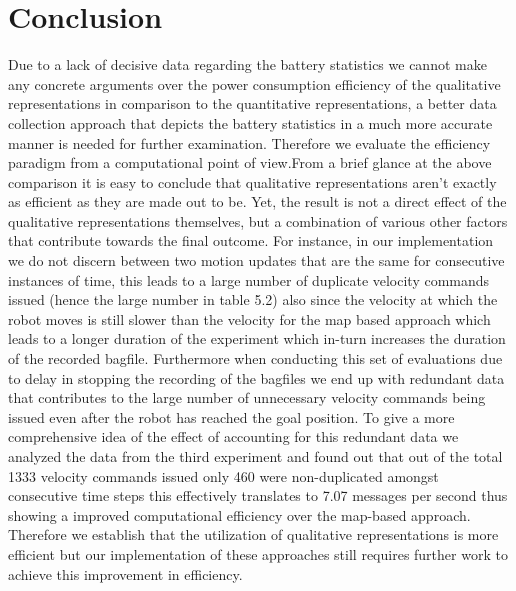 \section{Conclusion}
Due to a lack of decisive data regarding the battery statistics we cannot make any concrete arguments over the power consumption efficiency of the qualitative representations in comparison to the quantitative representations, a better data collection approach that depicts the battery statistics in a much more accurate manner is needed for further examination. Therefore we evaluate the efficiency paradigm from a computational point of view.From a brief glance at the above comparison it is easy to conclude that qualitative representations aren't exactly as efficient as they are made out to be. Yet, the result is not a direct effect of the qualitative representations themselves, but a combination of various other factors that contribute towards the final outcome. For instance, in our implementation we do not discern between two motion updates that are the same for consecutive instances of time, this leads to a large number of duplicate velocity commands issued (hence the large number in table 5.2) also since the velocity at which the robot moves is still slower than the velocity for the map based approach which leads to a longer duration of the experiment which in-turn increases the duration of the recorded bagfile. Furthermore when conducting this set of evaluations due to delay in stopping the recording of the bagfiles we end up with redundant data that contributes to the  large number of unnecessary velocity commands being issued even after the robot has reached the goal position. To give a more comprehensive idea of the effect of accounting for this redundant data we analyzed the data from the third experiment and found out that out of the total 1333 velocity commands issued only 460 were non-duplicated amongst consecutive time steps this effectively translates to 7.07 messages per second thus showing a improved computational efficiency over the map-based approach. Therefore we establish that the utilization of qualitative representations is more efficient but our implementation of these approaches still requires further work to achieve this improvement in efficiency. 

